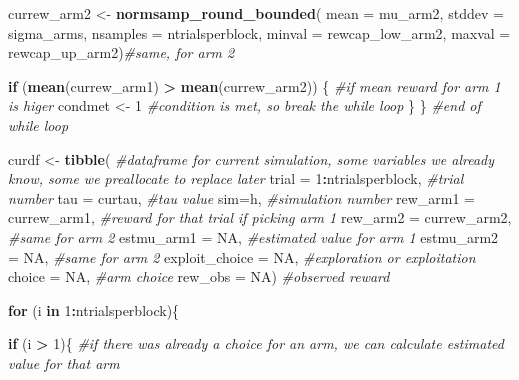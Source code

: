 \documentclass[
]{article}
\newenvironment{Shaded}{\begin{snugshade}}{\end{snugshade}}
\newcommand{\AttributeTok}[1]{\textcolor[rgb]{0.13,0.29,0.53}{#1}}
\newcommand{\CommentTok}[1]{\textcolor[rgb]{0.56,0.35,0.01}{\textit{#1}}}
\newcommand{\ConstantTok}[1]{\textcolor[rgb]{0.56,0.35,0.01}{#1}}
\newcommand{\ControlFlowTok}[1]{\textcolor[rgb]{0.13,0.29,0.53}{\textbf{#1}}}
\newcommand{\DecValTok}[1]{\textcolor[rgb]{0.00,0.00,0.81}{#1}}
\newcommand{\FunctionTok}[1]{\textcolor[rgb]{0.13,0.29,0.53}{\textbf{#1}}}
\newcommand{\NormalTok}[1]{#1}
\newcommand{\OtherTok}[1]{\textcolor[rgb]{0.56,0.35,0.01}{#1}}
\newcommand{\SpecialCharTok}[1]{\textcolor[rgb]{0.81,0.36,0.00}{\textbf{#1}}}
\begin{document}
\begin{Shaded}
\begin{Highlighting}[]
\NormalTok{        currew\_arm2 }\OtherTok{\textless{}{-}} \FunctionTok{normsamp\_round\_bounded}\NormalTok{(}
          \AttributeTok{mean =}\NormalTok{ mu\_arm2,}
          \AttributeTok{stddev =}\NormalTok{ sigma\_arms, }
          \AttributeTok{nsamples =}\NormalTok{ ntrialsperblock, }
          \AttributeTok{minval =}\NormalTok{ rewcap\_low\_arm2, }
          \AttributeTok{maxval =}\NormalTok{ rewcap\_up\_arm2)}\CommentTok{\#same, for arm 2}
        
        \ControlFlowTok{if}\NormalTok{ (}\FunctionTok{mean}\NormalTok{(currew\_arm1) }\SpecialCharTok{\textgreater{}} \FunctionTok{mean}\NormalTok{(currew\_arm2)) \{ }\CommentTok{\#if mean reward for arm 1 is higer}
\NormalTok{          condmet }\OtherTok{\textless{}{-}} \DecValTok{1} \CommentTok{\#condition is met, so break the while loop}
\NormalTok{        \}}
\NormalTok{      \} }\CommentTok{\#end of while loop}
      
\NormalTok{      curdf }\OtherTok{\textless{}{-}} \FunctionTok{tibble}\NormalTok{( }\CommentTok{\#dataframe for current simulation, some variables we already know, some we preallocate to replace later}
        \AttributeTok{trial =} \DecValTok{1}\SpecialCharTok{:}\NormalTok{ntrialsperblock, }\CommentTok{\#trial number}
        \AttributeTok{tau =}\NormalTok{ curtau, }\CommentTok{\#tau value}
        \AttributeTok{sim=}\NormalTok{h, }\CommentTok{\#simulation number}
        \AttributeTok{rew\_arm1 =}\NormalTok{ currew\_arm1, }\CommentTok{\#reward for that trial if picking arm 1}
        \AttributeTok{rew\_arm2 =}\NormalTok{ currew\_arm2, }\CommentTok{\#same for arm 2}
        \AttributeTok{estmu\_arm1 =} \ConstantTok{NA}\NormalTok{, }\CommentTok{\#estimated value for arm 1}
        \AttributeTok{estmu\_arm2 =} \ConstantTok{NA}\NormalTok{, }\CommentTok{\#same for arm 2}
        \AttributeTok{exploit\_choice =} \ConstantTok{NA}\NormalTok{, }\CommentTok{\#exploration or exploitation}
        \AttributeTok{choice =} \ConstantTok{NA}\NormalTok{, }\CommentTok{\#arm choice}
        \AttributeTok{rew\_obs =} \ConstantTok{NA}\NormalTok{) }\CommentTok{\#observed reward}
      
      \ControlFlowTok{for}\NormalTok{ (i }\ControlFlowTok{in} \DecValTok{1}\SpecialCharTok{:}\NormalTok{ntrialsperblock)\{ }
        
        \ControlFlowTok{if}\NormalTok{ (i }\SpecialCharTok{\textgreater{}} \DecValTok{1}\NormalTok{)\{ }\CommentTok{\#if there was already a choice for an arm, we can calculate estimated value for that arm}
          

\end{Highlighting}
\end{Shaded}
\end{document}
